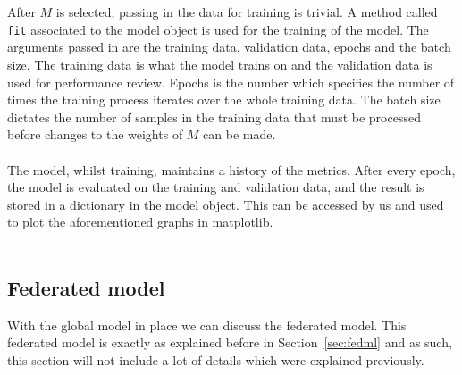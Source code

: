 \documentclass[12pt]{article}
\begin{document}
\\\\
After $M$ is selected, passing in the data for training is trivial. A method called \texttt{fit} associated to the model object is used for the training of the model. The arguments passed in are the training data, validation data, epochs and the batch size. The training data is what the model trains on and the validation data is used for performance review. Epochs is the number which specifies the number of times the training process iterates over the whole training data. The batch size dictates the number of samples in the training data that must be processed before changes to the weights of $M$ can be made.
\\\\
The model, whilst training, maintains a history of the metrics. After every epoch, the model is evaluated on the training and validation data, and the result is stored in a dictionary in the model object. This can be accessed by us and used to plot the aforementioned graphs in matplotlib. 
\\\\
\subsection{Federated model}\label{subsec:fedml-core}
With the global model in place we can discuss the federated model. This federated model is exactly as explained before in Section~\ref{sec:fedml} and as such, this section will not include a lot of details which were explained previously. 
\end{document}
